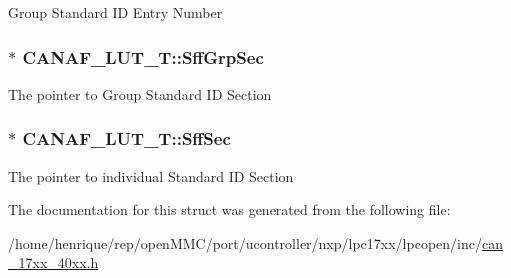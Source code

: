 Group Standard I\-D Entry Number \hypertarget{structCANAF__LUT__T_abcfa9b72b2a981e655551810d52c5fff}{
\subsubsection[{Sff\-Grp\-Sec}]{$\ast$ C\-A\-N\-A\-F\-\_\-\-L\-U\-T\-\_\-\-T\-::\-Sff\-Grp\-Sec}}\label{structCANAF__LUT__T_abcfa9b72b2a981e655551810d52c5fff}
The pointer to Group Standard I\-D Section \hypertarget{structCANAF__LUT__T_a34daf657f3d2a50e721daa0ab7dee994}{
\subsubsection[{Sff\-Sec}]{$\ast$ C\-A\-N\-A\-F\-\_\-\-L\-U\-T\-\_\-\-T\-::\-Sff\-Sec}}\label{structCANAF__LUT__T_a34daf657f3d2a50e721daa0ab7dee994}
The pointer to individual Standard I\-D Section 

The documentation for this struct was generated from the following file\-:\begin{DoxyCompactItemize}
\item 
/home/henrique/rep/open\-M\-M\-C/port/ucontroller/nxp/lpc17xx/lpcopen/inc/\hyperlink{can__17xx__40xx_8h}{can\-\_\-17xx\-\_\-40xx.\-h}\end{DoxyCompactItemize}
